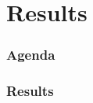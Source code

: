 \section{Results}

\begin{frame}
\frametitle{Agenda}
\tableofcontents[currentsection]
\end{frame}

\begin{frame}
\frametitle{Results}

\end{frame}
